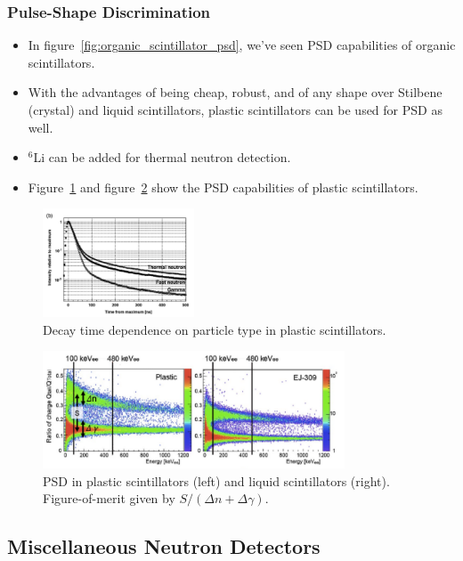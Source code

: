 \subsubsection{Pulse-Shape Discrimination}
\begin{itemize}
    \item In figure~\ref{fig:organic_scintillator_psd}, we've seen PSD capabilities of organic scintillators. 
    \item With the advantages of being cheap, robust, and of any shape over Stilbene (crystal) and liquid scintillators, plastic scintillators can be used for PSD as well. 
    \item $^6$Li can be added for thermal neutron detection.
    \item Figure~\ref{fig:decay_time_plastic_scintillator} and figure~\ref{fig:PSD_plastic_scintillator} show the PSD capabilities of plastic scintillators.
\end{itemize}
\begin{figure}[ht]
    \centering
    \includegraphics[width=0.4\textwidth]{images/decay_time_plastic_scintillator.png}
    \caption{Decay time dependence on particle type in plastic scintillators.}
    \label{fig:decay_time_plastic_scintillator}
\end{figure}
\begin{figure}[ht]
    \centering
    \includegraphics[width=0.8\textwidth]{images/PSD_plastic_scintillator.png}
    \caption{PSD in plastic scintillators (left) and liquid scintillators (right). Figure-of-merit given by $S/(\Delta n+\Delta\gamma)$.}
    \label{fig:PSD_plastic_scintillator}
\end{figure}
\subsection{Miscellaneous Neutron Detectors}
